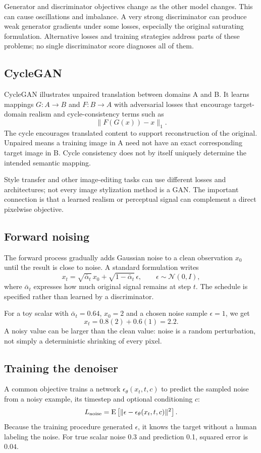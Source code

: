 \documentclass[11pt]{article}
\begin{document}
Generator and discriminator objectives change as the other model changes. This can cause oscillations and imbalance. A very strong discriminator can produce weak generator gradients under some losses, especially the original saturating formulation. Alternative losses and training strategies address parts of these problems; no single discriminator score diagnoses all of them.

\subsection{CycleGAN}
CycleGAN illustrates unpaired translation between domains A and B. It learns mappings $G:A\to B$ and $F:B\to A$ with adversarial losses that encourage target-domain realism and cycle-consistency terms such as
\[
\|F(G(x))-x\|_1.
\]
The cycle encourages translated content to support reconstruction of the original. Unpaired means a training image in A need not have an exact corresponding target image in B. Cycle consistency does not by itself uniquely determine the intended semantic mapping.

Style transfer and other image-editing tasks can use different losses and architectures; not every image stylization method is a GAN. The important connection is that a learned realism or perceptual signal can complement a direct pixelwise objective.

\subsection{Forward noising}
The forward process gradually adds Gaussian noise to a clean observation $x_0$ until the result is close to noise. A standard formulation writes
\[
x_t=\sqrt{\bar\alpha_t}\,x_0+
\sqrt{1-\bar\alpha_t}\,\epsilon,\qquad
\epsilon\sim\mathcal N(0,I),
\]
where $\bar\alpha_t$ expresses how much original signal remains at step $t$. The schedule is specified rather than learned by a discriminator.

For a toy scalar with $\bar\alpha_t=0.64$, $x_0=2$ and a chosen noise sample $\epsilon=1$, we get
\[
x_t=0.8(2)+0.6(1)=2.2.
\]
A noisy value can be larger than the clean value: noise is a random perturbation, not simply a deterministic shrinking of every pixel.

\subsection{Training the denoiser}
A common objective trains a network $\epsilon_\theta(x_t,t,c)$ to predict the sampled noise from a noisy example, its timestep and optional conditioning $c$:
\[
L_{\mathrm{noise}}=
\operatorname{E}\left[\|\epsilon-\epsilon_\theta(x_t,t,c)\|^2\right].
\]
Because the training procedure generated $\epsilon$, it knows the target without a human labeling the noise. For true scalar noise 0.3 and prediction 0.1, squared error is $0.04$.
\end{document}
